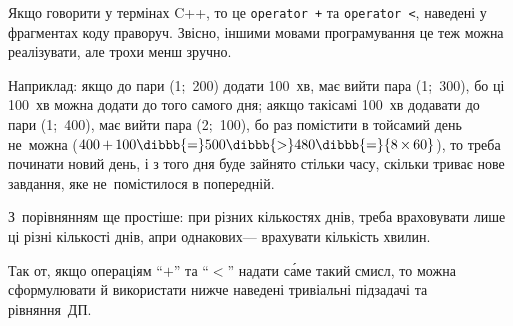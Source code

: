 Якщо говорити у термінах C++, то це \texttt{operator~+} та \texttt{operator~<}, наведені у фрагментах коду праворуч. Звісно, іншими мовами програмування це теж можна реалізувати, але трохи менш зручно.

Наприклад: якщо до пари (1;~200) додати 100~хв, має вийти пара (1;~300), бо ці 100~хв можна додати до того самого дня; а\nolinebreak[2] якщо такі\nolinebreak[2] самі 100~хв додавати до пари (1;~400), має вийти пара (2;~100), бо раз помістити в той\nolinebreak[2] самий день не~можна (${400\,{+}\,100}\dibbb{{=}}500\dibbb{{>}}480\dibbb{{=}}{8\,{\times}\,60}$), то треба починати новий день, і з того дня буде зайнято %
стільки часу, скільки триває нове завдання, яке не~помістилося в попередній. 


З~порівнянням ще простіше: при різних кількостях днів, треба враховувати лише ці різні кількості днів, а\nolinebreak[2] при однакових\nolinebreak[3] ---  врахувати кількість хвилин.

Так от, якщо операціям ``$+$'' та ``$<$'' надати с\'{а}ме такий смисл, то можна сформулювати й використати нижче наведені тривіальні під\-задачі та рівняння~ДП.

\vspace{-0.75\baselineskip}

